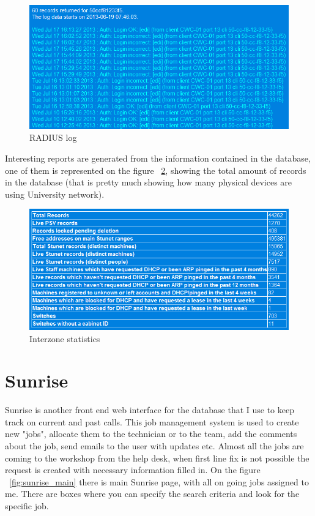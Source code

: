 \documentclass[10pt,a4paper,headinclude=true,twoside]{report}
\begin{document}
\begin{figure}[H]
\centering
\centerline{\includegraphics[scale=0.5]{./interzone_radius}}
\caption{RADIUS log}
\label{fig:interzone_radius}
\end{figure}

Interesting reports are generated from the information contained in the database, one of them is represented on the figure ~\ref{fig:interzone_statistics}, showing the total amount of records in the database (that is pretty much showing how many physical devices are using University network).

\begin{figure}[H]
\centering
\centerline{\includegraphics[scale=0.5]{./interzone_statistics}}
\caption{Interzone statistics}
\label{fig:interzone_statistics}
\end{figure}

\section{Sunrise}
Sunrise is another front end web interface for the database that I use to keep track on current and past calls. This job management system is used to create new "jobs", allocate them to the technician or to the team, add the comments about the job, send emails to the user with updates etc. Almost all the jobs are coming to the workshop from the help desk, when first line fix is not possible the request is created with necessary information filled in. On the figure ~\ref{fig:sunrise_main} there is main Sunrise page, with all on going jobs assigned to me. There are boxes where you can specify the search criteria and look for the specific job.
\end{document}
